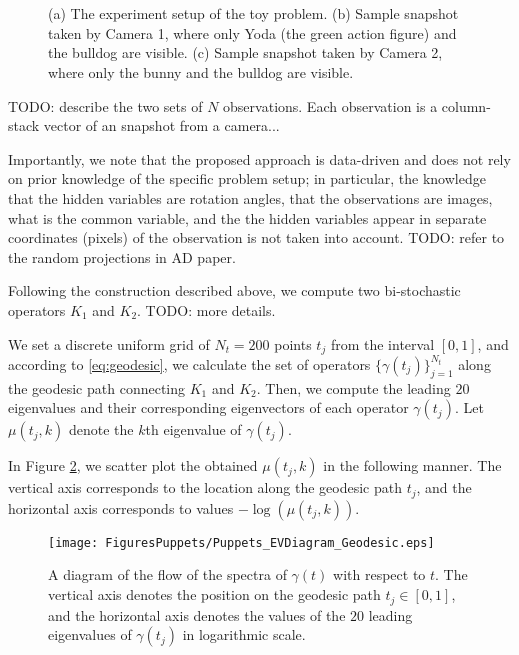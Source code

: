 \documentclass[]{article}
\theoremstyle{definition}
\begin{document}
	\begin{figure}[t]%
		\centering
		 \\
		\hspace{1cm} \\
		\caption{(a) The experiment setup of the toy problem. (b) Sample snapshot
			taken by Camera 1, where only Yoda (the green action figure) and the
			bulldog are visible. (c) Sample snapshot taken by Camera 2, where only the
			bunny and the bulldog are visible.}%
		\label{fig:Puppets_Setup}%
	\end{figure}

TODO: describe the two sets of $N$ observations. Each observation is a column-stack vector of an snapshot from a camera...

Importantly, we note that the proposed approach is data-driven and does not rely on prior knowledge of the specific problem setup; in particular, the knowledge that the hidden variables are rotation angles, that the observations are images, what is the common variable, and the the hidden variables appear in separate coordinates (pixels) of the observation is not taken into account. TODO: refer to the random projections in AD paper.

Following the construction described above, we compute two bi-stochastic operators $K_1$ and $K_2$. TODO: more details.

We set a discrete uniform grid of $N_t=200$ points $t_j$ from the interval $[0,1]$, and according to \eqref{eq:geodesic}, we calculate the set of operators $\{\gamma(t_j)\}_{j=1}^{N_t}$ along the geodesic path connecting $K_1$ and $K_2$. 
%
Then, we compute the leading $20$ eigenvalues and their corresponding eigenvectors of each operator $\gamma(t_j)$. 
Let $\mu(t_j,k)$ denote the $k$th eigenvalue of $\gamma(t_j)$.

In Figure \ref{fig:Puppets_EVDiagrams_Geodesic}, we scatter plot the obtained $\mu(t_j,k)$ in the following manner.
%
The vertical axis corresponds to the location along the geodesic path $t_j$, and the horizontal axis corresponds to values $-\log(\mu(t_j,k))$.

\begin{figure}[t]
\centering
\texttt{[image: FiguresPuppets/Puppets\_EVDiagram\_Geodesic.eps]} 
\caption {A diagram of the flow of the spectra of $\gamma(t)$ with respect to $t$. The vertical axis denotes the position on the geodesic path $t_j \in [0,1]$, and the horizontal axis denotes the values of the $20$ leading eigenvalues of $\gamma(t_j)$ in logarithmic scale.}
\label{fig:Puppets_EVDiagrams_Geodesic}
\end{figure}
\end{document}
